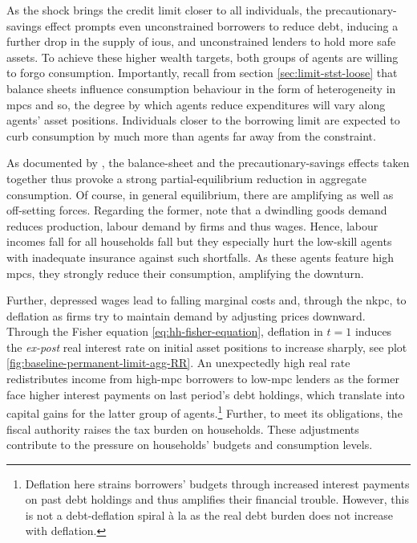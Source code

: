 \documentclass[12pt]{article} %
\numberwithin{equation}{section} %
\numberwithin{figure}{section}
\numberwithin{table}{section}
\begin{document}
As the shock brings the credit limit closer to all individuals, the precautionary-savings effect prompts even unconstrained borrowers to reduce debt, inducing a further drop in the supply of \Gls{iou}s, and unconstrained lenders to hold more safe assets. To achieve these higher wealth targets, both groups of agents are willing to forgo consumption. Importantly, recall from section \ref{sec:limit-stst-loose} that balance sheets influence consumption behaviour in the form of heterogeneity in \Gls{mpc}s and so, the degree by which agents reduce expenditures will vary along agents' asset positions. Individuals closer to the borrowing limit are expected to curb consumption by much more than agents far away from the constraint.

As documented by \textcite{gl2017}, the balance-sheet and the precautionary-savings effects taken together thus provoke a strong partial-equilibrium reduction in aggregate consumption. Of course, in general equilibrium, there are amplifying as well as off-setting forces. Regarding the former, note that a dwindling goods demand reduces production, labour demand by firms and thus wages. Hence, labour incomes fall for all households fall but they especially hurt the low-skill agents with inadequate insurance against such shortfalls. As these agents feature high \Gls{mpc}s, they strongly reduce their consumption, amplifying the downturn.

Further, depressed wages lead to falling marginal costs and, through the \Gls{nkpc}, to deflation as firms try to maintain demand by adjusting prices downward. Through the Fisher equation \eqref{eq:hh-fisher-equation}, deflation in $t=1$ induces the \textit{ex-post} real interest rate on initial asset positions to increase sharply, see plot \ref{fig:baseline-permanent-limit-agg-RR}. An unexpectedly high real rate redistributes income from high-\Gls{mpc} borrowers to low-\Gls{mpc} lenders as the former face higher interest payments on last period's debt holdings, which translate into capital gains for the latter group of agents.\footnote{Deflation here strains borrowers' budgets through increased interest payments on past debt holdings and thus amplifies their financial trouble. However, this is not a debt-deflation spiral à la \textcite{fisher1933} as the real debt burden does not increase with deflation.} Further, to meet its obligations, the fiscal authority raises the tax burden on households. These adjustments contribute to the pressure on households' budgets and consumption levels.
\end{document}
